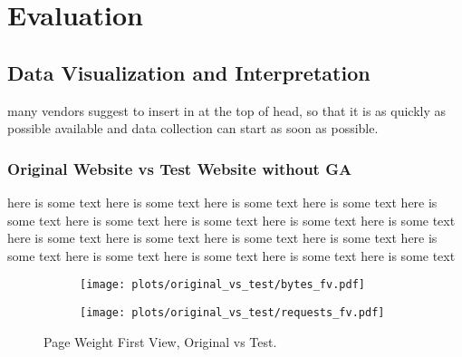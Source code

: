 \chapter{Evaluation}
















\section{Data Visualization and Interpretation}




many vendors suggest to insert in at the top of head, so that it is as quickly as possible available and data collection can start as soon as possible.






\subsection{Original Website vs Test Website without GA}

here is some text here is some text here is some text here is some text here is some text here is some text 
here is some text here is some text here is some text here is some text here is some text here is some text 
here is some text here is some text here is some text here is some text here is some text here is some text 

\begin{figure}
	\centering
	\begin{subfigure}{.5\textwidth}
		\centering
		\texttt{[image: plots/original\_vs\_test/bytes\_fv.pdf]}
		\label{fig:sub1}
	\end{subfigure}%
	\begin{subfigure}{.5\textwidth}
		\centering
		\texttt{[image: plots/original\_vs\_test/requests\_fv.pdf]}
		\label{fig:sub2}
	\end{subfigure}
	\caption{Page Weight First View, Original vs Test.}
	\label{figure:plt_original_test}
\end{figure}


